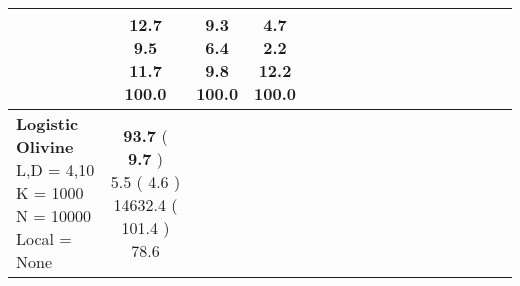 \documentclass[9pt]{article}
\begin{document}
\begin{landscape}
\begin{longtable}{ l | c c c c | c c c c | c c c c | c c c c |}
             &
                            \makecell{              12.7
     \\
            {\footnotesize             9.5
    } \\  {\footnotesize             11.7
     } \\
            {\small \textcolor[rgb]{ 0.2 , 0.7 , 0.1} {100.0  }
} }
             &                         \makecell{              9.3
     \\
            {\footnotesize             6.4
    } \\  {\footnotesize             9.8
     } \\
            {\small \textcolor[rgb]{ 0.2 , 0.7 , 0.1} {100.0  }
} }
             &
                            \makecell{              \textbf{ 4.7 }
     \\
            {\footnotesize             \textbf{ 2.2 }
    } \\  {\footnotesize             12.2
     } \\
            {\small \textcolor[rgb]{ 0.2 , 0.7 , 0.1} {100.0  }
} }
            

 \\
                                                            
                    \hline
                    \makecell{ \textbf{ Logistic Olivine} \\
                    { \small L,D = 4,10} \\
                    {\small K = 1000} \\
                    {\small N = 10000 } \\ {\small Local = None }} &
                    
                            \makecell{              \textbf{ 93.7 }
     (             \textbf{ 9.7 }
    ) \\
            {\footnotesize             5.5
     (              4.6
     )} \\
            {\footnotesize             14632.4
     (            101.4
    ) } \\
            {\small  \textcolor[rgb]{ 0.628 , 0.273 , 0.1} {78.6  }
} }



\end{longtable}
\end{landscape}
\end{document}
